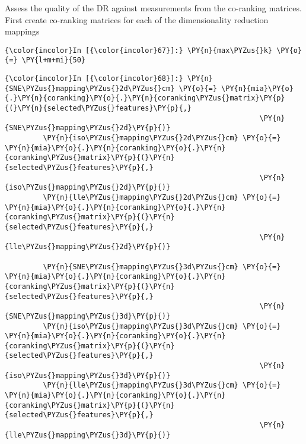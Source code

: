     Assess the quality of the DR against measurements from the co-ranking
matrices. First create co-ranking matrices for each of the
dimensionality reduction mappings

    \begin{Verbatim}[commandchars=\\\{\}]
{\color{incolor}In [{\color{incolor}67}]:} \PY{n}{max\PYZus{}k} \PY{o}{=} \PY{l+m+mi}{50}
\end{Verbatim}

    \begin{Verbatim}[commandchars=\\\{\}]
{\color{incolor}In [{\color{incolor}68}]:} \PY{n}{SNE\PYZus{}mapping\PYZus{}2d\PYZus{}cm} \PY{o}{=} \PY{n}{mia}\PY{o}{.}\PY{n}{coranking}\PY{o}{.}\PY{n}{coranking\PYZus{}matrix}\PY{p}{(}\PY{n}{selected\PYZus{}features}\PY{p}{,}
                                                            \PY{n}{SNE\PYZus{}mapping\PYZus{}2d}\PY{p}{)}
         \PY{n}{iso\PYZus{}mapping\PYZus{}2d\PYZus{}cm} \PY{o}{=} \PY{n}{mia}\PY{o}{.}\PY{n}{coranking}\PY{o}{.}\PY{n}{coranking\PYZus{}matrix}\PY{p}{(}\PY{n}{selected\PYZus{}features}\PY{p}{,}
                                                            \PY{n}{iso\PYZus{}mapping\PYZus{}2d}\PY{p}{)}
         \PY{n}{lle\PYZus{}mapping\PYZus{}2d\PYZus{}cm} \PY{o}{=} \PY{n}{mia}\PY{o}{.}\PY{n}{coranking}\PY{o}{.}\PY{n}{coranking\PYZus{}matrix}\PY{p}{(}\PY{n}{selected\PYZus{}features}\PY{p}{,}
                                                            \PY{n}{lle\PYZus{}mapping\PYZus{}2d}\PY{p}{)}

         \PY{n}{SNE\PYZus{}mapping\PYZus{}3d\PYZus{}cm} \PY{o}{=} \PY{n}{mia}\PY{o}{.}\PY{n}{coranking}\PY{o}{.}\PY{n}{coranking\PYZus{}matrix}\PY{p}{(}\PY{n}{selected\PYZus{}features}\PY{p}{,}
                                                            \PY{n}{SNE\PYZus{}mapping\PYZus{}3d}\PY{p}{)}
         \PY{n}{iso\PYZus{}mapping\PYZus{}3d\PYZus{}cm} \PY{o}{=} \PY{n}{mia}\PY{o}{.}\PY{n}{coranking}\PY{o}{.}\PY{n}{coranking\PYZus{}matrix}\PY{p}{(}\PY{n}{selected\PYZus{}features}\PY{p}{,}
                                                            \PY{n}{iso\PYZus{}mapping\PYZus{}3d}\PY{p}{)}
         \PY{n}{lle\PYZus{}mapping\PYZus{}3d\PYZus{}cm} \PY{o}{=} \PY{n}{mia}\PY{o}{.}\PY{n}{coranking}\PY{o}{.}\PY{n}{coranking\PYZus{}matrix}\PY{p}{(}\PY{n}{selected\PYZus{}features}\PY{p}{,}
                                                            \PY{n}{lle\PYZus{}mapping\PYZus{}3d}\PY{p}{)}
\end{Verbatim}

